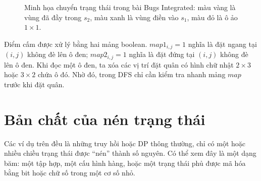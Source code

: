 \documentclass[11pt]{article}
\begin{document}
\begin{figure}[ht]
\centering
{}
\caption{Minh họa chuyển trạng thái trong bài Bugs Integrated: màu vàng là vùng đã đầy trong \(s_2\), màu xanh là vùng điền vào \(s_1\), màu đỏ là ô ảo \(1\times1\).}
\end{figure}

Điểm cấm được xử lý bằng hai mảng boolean. \(map1_{i,j}=1\) nghĩa là đặt
ngang tại \((i,j)\) không đè lên ô đen; \(map2_{i,j}=1\) nghĩa là đặt đứng tại
\((i,j)\) không đè lên ô đen. Khi đọc một ô đen, ta xóa các vị trí đặt quân
có hình chữ nhật \(2\times3\) hoặc \(3\times2\) chứa ô đó. Nhờ đó, trong DFS
chỉ cần kiểm tra nhanh mảng \(map\) trước khi đặt quân.

\section{Bản chất của nén trạng thái}

Các ví dụ trên đều là những truy hồi hoặc DP thông thường, chỉ có một hoặc
nhiều chiều trạng thái được ``nén'' thành số nguyên. Có thể xem đây là một
dạng băm: một tập hợp, một cấu hình hàng, hoặc một trạng thái phủ được mã hóa
bằng bit hoặc chữ số trong một cơ số nhỏ.
\end{document}

